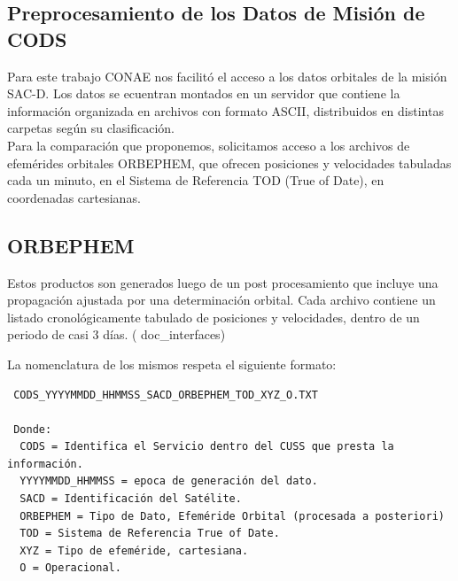 \subsection*{Preprocesamiento de los Datos de Misi\'on de CODS}
Para este trabajo CONAE nos facilit\'o el acceso a los datos orbitales de la misi\'on SAC-D.
Los datos se ecuentran montados en un servidor que contiene la informaci\'on organizada en archivos con formato ASCII, distribuidos en distintas carpetas seg\'un su clasificaci\'on.\\
Para la comparaci\'on que proponemos, solicitamos acceso a los archivos de efem\'erides orbitales ORBEPHEM, que ofrecen posiciones y velocidades tabuladas cada un minuto, en el Sistema de Referencia TOD (True of Date), en coordenadas cartesianas.

\subsection*{ORBEPHEM}
Estos productos son generados luego de un post procesamiento que incluye una propagaci\'on ajustada por una determinaci\'on orbital. 
Cada archivo contiene un listado cronol\'ogicamente tabulado de posiciones y velocidades, dentro de un periodo de casi 3 d\'ias. ( doc\_interfaces)

La nomenclatura de los mismos respeta el siguiente formato:\\
\begin{verbatim}
 CODS_YYYYMMDD_HHMMSS_SACD_ORBEPHEM_TOD_XYZ_O.TXT
 
 Donde:
  CODS = Identifica el Servicio dentro del CUSS que presta la información.
  YYYYMMDD_HHMMSS = epoca de generación del dato.
  SACD = Identificación del Satélite.
  ORBEPHEM = Tipo de Dato, Efeméride Orbital (procesada a posteriori)
  TOD = Sistema de Referencia True of Date.
  XYZ = Tipo de efeméride, cartesiana.
  O = Operacional. 
\end{verbatim}


